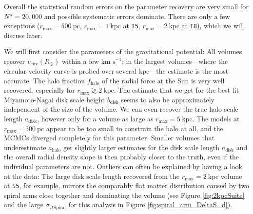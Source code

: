 \documentclass[iop,revtex4,numberedappendix,appendixfloats]{emulateapj}
\newcommand{\OLD}[1]{}
\begin{document}
\OLD{Having illustrated in Section \ref{sec:circvel_surfdens} that the potential recovery is qualitatively successful, we will investigate this result more quantitatively in the following two sections. We start here by discussing the recovered best fit potential and qDF parameters for all analyses, which are displayed in Figure \ref{fig:model_parameters}, and compared to the parameters of the reference \texttt{DEHH-Pot} from Table \ref{tbl:DEHH-Pot}.}

Overall the statistical random errors on the parameter recovery are very small for $N*=20,000$ and possible systematic errors dominate. There are only a few exceptions ($r_\text{max}=500~\text{pc}$, $r_\text{max}=1~\text{kpc}$ at \texttt{I5}, $r_\text{max}=2~\text{kpc}$ at \texttt{I8}), which we will discuss later.

We will first consider the parameters of the gravitational potential: All volumes recover $v_\text{circ}(R_\odot)$ within a few $\text{km s}^{-1}$; in the largest volumes---where the circular velocity curve is probed over several $\text{kpc}$---the estimate is the most accurate. The halo fraction $f_\text{halo}$ of the radial force at the Sun is very well recovered, especially for $r_\text{max}\gtrsim 2~\text{kpc}$. The estimate that we get for the best fit Miyamoto-Nagai disk scale height $b_\text{disk}$ seems to also be approximately independent of the size of the volume. We can even recover the true halo scale length $a_\text{disk}$, however only for a volume as large as $r_\text{max}=5~\text{kpc}$. The models at $r_\text{max}=500~\text{pc}$ appear to be too small to constrain the halo at all, and the MCMCs diverged completely for this parameter. Smaller volumes that underestimate $a_\text{halo}$ get slightly larger estimates for the disk scale length $a_\text{disk}$ and the overall radial density slope is then probably closer to the truth, even if the individual parameters are not. Outliers can often be explained by having a look at the data: The large disk scale length recovered from the $r_\text{max}=2~\text{kpc}$ volume at \texttt{S5}, for example, mirrors the comparably flat matter distribution caused by two spiral arms close together and dominating the volume (see Figure \ref{fig:2kpcSuite} and the large $\sigma_{\Delta\text{Spiral}}$ for this analysis in Figure \ref{fig:spiral_arm_DeltaS_d}). 
\end{document}
